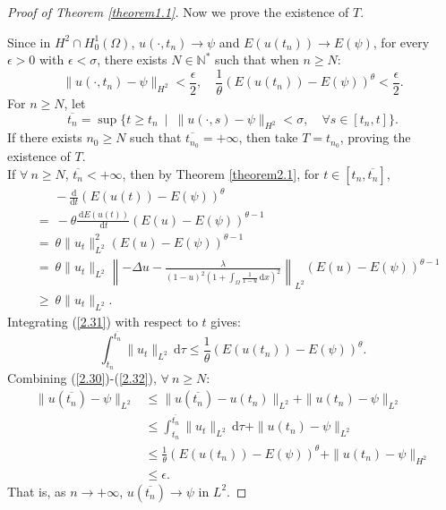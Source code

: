 \documentclass{article}
\numberwithin{equation}{section}
\begin{document}
\begin{proof}[Proof of Theorem \ref{theorem1.1}]
    Now we prove the existence of $T$.

    Since in $H^2\cap H_0^1(\Omega)$, $u(\cdot,t_n)\to \psi$ and $E(u(t_n))\to E(\psi)$, for every $\epsilon>0$ with $\epsilon<\sigma$, there exists $N\in \mathbb{N}^{*}$ such that when $n\ge N$:
    \begin{equation}
        \|u(\cdot,t_n)-\psi\|_{H^2}<\frac{\epsilon}{2},\quad \frac{1}{\theta}(E(u(t_n))-E(\psi))^{\theta}<\frac{\epsilon}{2}.\label{2.30}
    \end{equation}
    For $n\ge N$, let
    $$\overline{t_n}=\sup\{t\ge t_n\ \mid\ \|u(\cdot,s)-\psi\|_{H^2}<\sigma,\quad \forall s\in[t_n,t]\}.$$
    If there exists $n_0\ge N$ such that $\overline{t_{n_0}}=+\infty$, then take $T=t_{n_0}$, proving the existence of $T$.\\
    If $\forall\ n\ge N$, $\overline{t_n}<+\infty$,
    then by Theorem \ref{theorem2.1}, for $t\in [t_n,\overline{t_n}]$,
    \begin{equation}
        \begin{aligned}
            &\quad\ \ -\frac{\mathrm{d}}{\mathrm{d}t}(E(u(t))-E(\psi))^{\theta}\\
            &=\ -\theta\frac{\,\mathrm{d}E(u(t))}{\,\mathrm{d}t}(E(u)-E(\psi))^{\theta-1}\\
            &=\ \theta \|u_t\|_{L^2}^2(E(u)-E(\psi))^{\theta-1}\\
            &=\ \theta \|u_t\|_{L^2}\left\|-\Delta u-\frac{\lambda}{(1-u)^2(1+\int_{\Omega}\frac{1}{1-u}\,\mathrm{d}x)^2}\right\|_{L^{2}}(E(u)-E(\psi))^{\theta-1}\\
            &\ge\ \theta\|u_t\|_{L^2}.
        \end{aligned}\label{2.31}
    \end{equation}
    Integrating (\ref{2.31}) with respect to $t$ gives:
    \begin{equation}
        \int_{t_n}^{\overline{t_n}}\|u_t\|_{L^2}\,\mathrm{d}\tau\le \frac{1}{\theta}(E(u(t_n))-E(\psi))^{\theta}.\label{2.32}
    \end{equation}
    Combining (\ref{2.30})-(\ref{2.32}), $\forall\ n\ge N$:
    \begin{align*}
        \|u(\overline{t_n})-\psi\|_{L^2}&\le \|u(\overline{t_n})-u(t_n)\|_{L^2}+\|u(t_n)-\psi\|_{L^2}\\
        &\le \int_{t_n}^{\overline{t_n}}\|u_t\|_{L^2}\,\mathrm{d}\tau+\|u(t_n)-\psi\|_{L^2}\\
        &\le \frac{1}{\theta}(E(u(t_n))-E(\psi))^{\theta}+\|u(t_n)-\psi\|_{H^2}\\
        &\le \epsilon.
    \end{align*}
    That is, as $n\to +\infty$, $u(\overline{t_n})\to \psi$ in $L^2$.


\end{proof}
\end{document}
